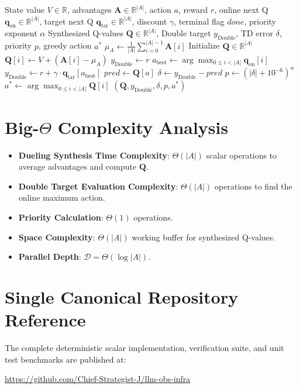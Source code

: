 \documentclass[11pt,a4paper]{article}
\theoremstyle{definition}
\begin{document}
\begin{algorithm}[H]
\caption{Rainbow Dueling Synthesis, Double DQN Target, and PER Priority}
\begin{algorithmic}[1]
\Require State value $V \in \mathbb{R}$, advantages $\mathbf{A} \in \mathbb{R}^{|A|}$, action $a$, reward $r$, online next Q $\mathbf{q}_{\text{on}} \in \mathbb{R}^{|A|}$, target next Q $\mathbf{q}_{\text{tar}} \in \mathbb{R}^{|A|}$, discount $\gamma$, terminal flag $done$, priority exponent $\alpha$
\Ensure Synthesized Q-values $\mathbf{Q} \in \mathbb{R}^{|A|}$, Double target $y_{\text{Double}}$, TD error $\delta$, priority $p$, greedy action $a^*$
\State $\mu_A \gets \frac{1}{|A|}\sum_{i=0}^{|A|-1} \mathbf{A}[i]$ 
\State Initialize $\mathbf{Q} \in \mathbb{R}^{|A|}$
    \State $\mathbf{Q}[i] \gets V + (\mathbf{A}[i] - \mu_A)$
\EndFor
{} 
    \State $y_{\text{Double}} \gets r$
\Else
    \State $a_{\text{best}} \gets \arg\max_{0 \le i < |A|} \mathbf{q}_{\text{on}}[i]$ 
    \State $y_{\text{Double}} \gets r + \gamma \cdot \mathbf{q}_{\text{tar}}[a_{\text{best}}]$ 
\EndIf
\State $pred \gets \mathbf{Q}[a]$
\State $\delta \gets y_{\text{Double}} - pred$ 
\State $p \gets (|\delta| + 10^{-6})^\alpha$ 
\State $a^* \gets \arg\max_{0 \le i < |A|} \mathbf{Q}[i]$
\State \Return $(\mathbf{Q}, y_{\text{Double}}, \delta, p, a^*)$
\end{algorithmic}
\end{algorithm}

\section{Big-$\Theta$ Complexity Analysis}

\begin{itemize}
    \item \textbf{Dueling Synthesis Time Complexity}: $\Theta(|A|)$ scalar operations to average advantages and compute $\mathbf{Q}$.
    \item \textbf{Double Target Evaluation Complexity}: $\Theta(|A|)$ operations to find the online maximum action.
    \item \textbf{Priority Calculation}: $\Theta(1)$ operations.
    \item \textbf{Space Complexity}: $\Theta(|A|)$ working buffer for synthesized Q-values.
    \item \textbf{Parallel Depth}: $\mathcal{D} = \Theta(\log |A|)$.
\end{itemize}

\section{Single Canonical Repository Reference}

The complete deterministic scalar implementation, verification suite, and unit test benchmarks are published at:
\begin{center}
\url{https://github.com/Chief-Strategist-J/llm-obs-infra}
\end{center}
\end{document}

